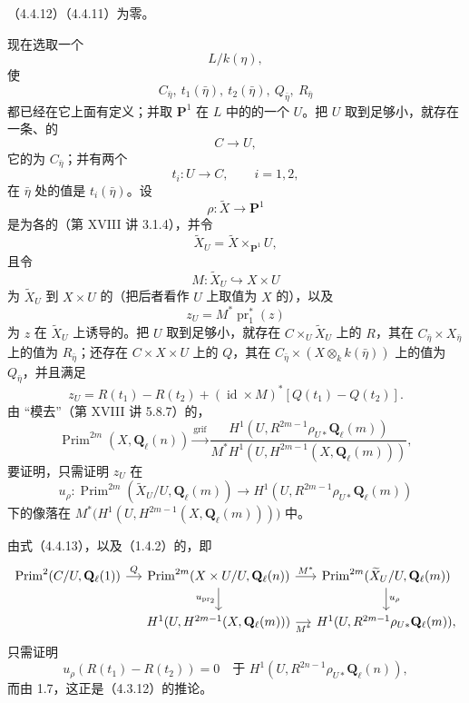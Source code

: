 \noindent（4.4.12）（4.4.11）为零。

现在选取一个
\[L/k(\eta),\]
使
\[C_{\bar\eta},\ t_1(\bar\eta),\ t_2(\bar\eta),\ Q_{\bar\eta},\ R_{\bar\eta}\]
都已经在它上面有定义；并取 $\mathbf P^1$ 在 $L$ 中的的一个 $U$。把 $U$ 取到足够小，就存在一条、的
\[C\longrightarrow U,\]
它的为 $C_{\bar\eta}$；并有两个
\[t_i:U\longrightarrow C,\qquad i=1,2,\]
在 $\bar\eta$ 处的值是 $t_i(\bar\eta)$。设
\[\rho:\widetilde X\longrightarrow\mathbf P^1\]
是为各的（第 XVIII 讲 3.1.4），并令
\[\widetilde X_U=\widetilde X\times_{\mathbf P^1}U,\]
且令
\[M:\widetilde X_U\hookrightarrow X\times U\]
为 $\widetilde X_U$ 到 $X\times U$ 的（把后者看作 $U$ 上取值为 $X$ 的），以及
\[z_U=M^*\operatorname{pr}_1^*(z)\]
为 $z$ 在 $\widetilde X_U$ 上诱导的。把 $U$ 取到足够小，就存在 $C\times_U\widetilde X_U$ 上的 $R$，其在 $C_{\bar\eta}\times X_{\bar\eta}$ 上的值为 $R_{\bar\eta}$；还存在 $C\times X\times U$ 上的 $Q$，其在 $C_{\bar\eta}\times(X\otimes_k k(\bar\eta))$ 上的值为 $Q_{\bar\eta}$，并且满足
\begin{equation}\tag{4.4.13}
z_U=R(t_1)-R(t_2)+(\operatorname{id}\times M)^*[Q(t_1)-Q(t_2)].
\end{equation}
由 “模去”（第 XVIII 讲 5.8.7）的，
\[
\operatorname{Prim}^{2m}(X,\mathbf Q_\ell(n))\xrightarrow{\operatorname{grif}}
\frac{H^1(U,R^{2m-1}\rho_{U*}\mathbf Q_\ell(m))}{M^*H^1(U,H^{2m-1}(X,\mathbf Q_\ell(m)))},
\]
要证明，只需证明 $z_U$ 在
\[
u_\rho:\operatorname{Prim}^{2m}(\widetilde X_U/U,\mathbf Q_\ell(m))\longrightarrow H^1(U,R^{2m-1}\rho_{U*}\mathbf Q_\ell(m))
\]
下的像落在 $M^*\bigl(H^1(U,H^{2m-1}(X,\mathbf Q_\ell(m)))\bigr)$ 中。

由式（4.4.13），以及（1.4.2）的，即
\[
\begin{tikzcd}[column sep=small]
\operatorname{Prim}^2(C/U,\mathbf Q_\ell(1)) \arrow[r,"Q"] & \operatorname{Prim}^{2m}(X\times U/U,\mathbf Q_\ell(n)) \arrow[r,"M^*"] \arrow[d,"u_{\operatorname{pr}_2}"'] & \operatorname{Prim}^{2m}(\widetilde X_U/U,\mathbf Q_\ell(m)) \arrow[d,"u_\rho"]\\
& H^1(U,H^{2m-1}(X,\mathbf Q_\ell(m))) \arrow[r,"M^*"'] & H^1(U,R^{2m-1}\rho_{U*}\mathbf Q_\ell(m)),
\end{tikzcd}
\]
只需证明
\[
u_\rho(R(t_1)-R(t_2))=0\quad\text{于 }H^1(U,R^{2n-1}\rho_{U*}\mathbf Q_\ell(n)),
\]
而由 1.7，这正是（4.3.12）的推论。

